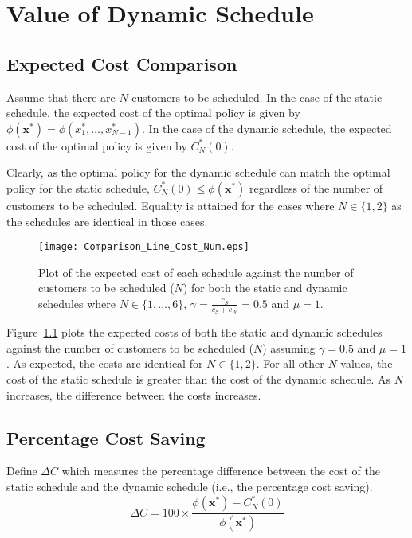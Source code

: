 \chapter{Value of Dynamic Schedule}

\section{Expected Cost Comparison}

Assume that there are $N$ customers to be scheduled. In the case of the static schedule, the expected cost of the optimal policy is given by $\phi (\mathbf{x}^{*}) = \phi (x_{1}^{*}, \ldots, x_{N - 1}^{*})$. In the case of the dynamic schedule, the expected cost of the optimal policy is given by $C_{N}^{*} (0)$.

Clearly, as the optimal policy for the dynamic schedule can match the optimal policy for the static schedule, $C_{N}^{*} (0) \leq \phi (\mathbf{x}^{*})$ regardless of the number of customers to be scheduled. Equality is attained for the cases where $N \in \{ 1, 2 \}$ as the schedules are identical in those cases.

\begin{figure}[htb]
	\centering
	\texttt{[image: Comparison\_Line\_Cost\_Num.eps]}
	\caption{Plot of the expected cost of each schedule against the number of customers to be scheduled ($N$) for both the static and dynamic schedules where $N \in \{ 1, \ldots, 6 \}$, $\gamma = \frac{c_{S}}{c_{S} + c_{W}} = 0.5$ and $\mu = 1$.}
	\label{Graph_Cost_Comparison}
\end{figure}

Figure~\ref{Graph_Cost_Comparison} plots the expected costs of both the static and dynamic schedules against the number of customers to be scheduled ($N$) assuming $\gamma = 0.5$ and $\mu = 1$. As expected, the costs are identical for $N \in \{ 1, 2 \}$. For all other $N$ values, the cost of the static schedule is greater than the cost of the dynamic schedule. As $N$ increases, the difference between the costs increases.

\section{Percentage Cost Saving}

Define $\Delta C$  which measures the percentage difference between the cost of the static schedule and the dynamic schedule (i.e., the percentage cost saving).
\begin{equation}
	\Delta C = 100 \times \frac{\phi (\mathbf{x}^{*}) - C_{N}^{*} (0)}{\phi (\mathbf{x}^{*})}
\end{equation}

